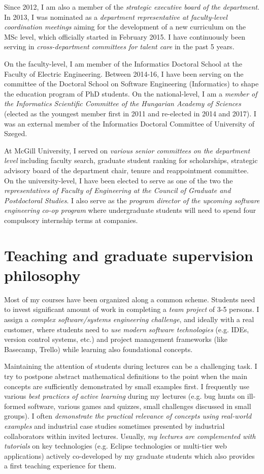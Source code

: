 \documentclass[a4paper,11pt]{article}
\begin{document}
Since 2012, I am also a member of the \emph{strategic executive board of the department}. In 2013, I was nominated as a \emph{department representative at faculty-level coordination meetings} aiming for the development of a new curriculum on the MSc level, which officially started in February 2015. I have continuously been serving in \emph{cross-department committees for talent care} in the past 5 years. 

On the faculty-level, I am member of the Informatics Doctoral School at the Faculty of Electric Engineering. Between 2014-16, I have been serving on the committee of the Doctoral School on Software Engineering (Informatics) to shape the education program of PhD students. On the national-level, I am a \emph{member of the Informatics Scientific Committee of the Hungarian Academy of Sciences} (elected as the youngest member first in 2011 and re-elected in 2014 and 2017). I was an external member of the Informatics Doctoral Committee of University of Szeged.

At McGill University, I served on \emph{various senior committees on the department level} including faculty search, graduate student ranking for scholarships, strategic advisory board of the department chair, tenure and reappointment committee. On the university-level, I have been elected to serve as one of the two the \emph{representatives of Faculty of Engineering at the Council of Graduate and Postdoctoral Studies}. I also serve as the \emph{program director of the upcoming software engineering co-op program } where undergraduate students will need to spend four compulsory internship terms at companies.

\section{Teaching and graduate supervision philosophy}

Most of my courses have been organized along a common scheme. Students need to invest significant amount of work in completing a \emph{team project} of 3-5 persons. I assign a \emph{complex software/systems engineering challenge}, and ideally with a real customer, where students need to \emph{use modern software technologies} (e.g. IDEs, version control systems, etc.) and project management frameworks (like Basecamp, Trello) while learning also foundational concepts. 

Maintaining the attention of students during lectures can be a challenging task. I try to postpone abstract mathematical definitions to the point when the main concepts are sufficiently demonstrated by small examples first. I frequently use various \emph{best practices of active learning} during my lectures (e.g. bug hunts on ill-formed software, various games and quizzes, small challenges discussed in small groups). I often \emph{demonstrate the practical relevance of concepts using real-world examples} and industrial case studies sometimes presented by industrial collaborators within invited lectures. Usually, \emph{my lectures are complemented with tutorials} on key technologies (e.g. Eclipse technologies or multi-tier web applications) actively co-developed by my graduate students which also provides a first teaching experience for them. 
\end{document}
